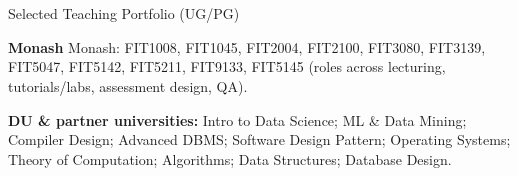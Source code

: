 \section{\faLineChart}{Selected Teaching Portfolio (UG/PG)}

\textbf{Monash} Monash: FIT1008, FIT1045, FIT2004, FIT2100, FIT3080, FIT3139, FIT5047, FIT5142, FIT5211, FIT9133, FIT5145 (roles across lecturing, tutorials/labs, assessment design, QA).

\noindent\textbf{DU \& partner universities:} Intro to Data Science; ML \& Data Mining; Compiler Design; Advanced DBMS; Software Design Pattern; Operating Systems; Theory of Computation; Algorithms; Data Structures; Database Design.
